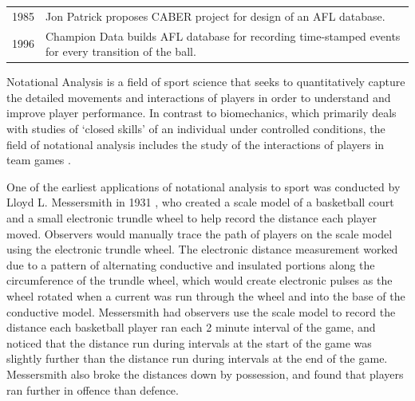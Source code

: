 \begin{longtable}[c]{@{}ll@{}}
\begin{minipage}[t]{0.09\columnwidth}\raggedright\strut
1985
\strut\end{minipage} &
\begin{minipage}[t]{0.65\columnwidth}\raggedright\strut
Jon Patrick proposes CABER project for design of an AFL database.
\strut\end{minipage}\tabularnewline
\begin{minipage}[t]{0.09\columnwidth}\raggedright\strut
1996
\strut\end{minipage} &
\begin{minipage}[t]{0.65\columnwidth}\raggedright\strut
Champion Data builds AFL database for recording time-stamped events for
every transition of the ball.
\strut\end{minipage}\tabularnewline
\bottomrule
\end{longtable}

Notational Analysis is a field of sport science that seeks to
quantitatively capture the detailed movements and interactions of
players in order to understand and improve player performance. In
contrast to biomechanics, which primarily deals with studies of `closed
skills' of an individual under controlled conditions, the field of
notational analysis includes the study of the interactions of players in
team games \cite{Hughes2002}.

One of the earliest \cite{hughes2004notational} applications of notational analysis to sport was conducted by Lloyd L. Messersmith in 1931 \cite{messersmith1931}, who created a scale model of a basketball court and a small electronic trundle wheel to help record the distance each player moved. Observers would manually trace the path of players on the scale model using the electronic trundle wheel. The electronic distance measurement worked due to a pattern of alternating conductive and insulated portions along the circumference of the trundle wheel, which would create electronic pulses as the wheel rotated when a current was run through the wheel and into the base of the conductive model. Messersmith had observers use the scale model to record the distance each basketball player ran each 2 minute interval of the game, and noticed that the distance run during intervals at the start of the game was slightly further than the distance run during intervals at the end of the game. Messersmith also broke the distances down by possession, and found that players ran further in offence than defence.


